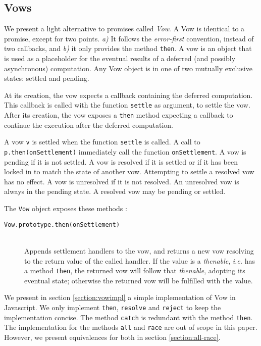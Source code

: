 \subsection{Vows} \label{section:vow}

We present a light alternative to promises called \textit{Vow}.
A Vow is identical to a promise, except for two points.
\textit{a)} It follows the \textit{error-first} convention, instead of two callbacks, and \textit{b)} it only provides the method \texttt{then}.
A vow is an object that is used as a placeholder for the eventual results of a deferred (and possibly asynchronous) computation.
Any Vow object is in one of two mutually exclusive states: settled and pending.

At its creation, the vow expects a callback containing the deferred computation.
This callback is called with the function \texttt{settle} as argument, to settle the vow.
After its creation, the vow exposes a \texttt{then} method expecting a callback to continue the execution after the deferred computation.


A vow \texttt{v} is settled when the function \texttt{settle} is called.
A call to \texttt{p.then(onSettlement)} immediately call the function \texttt{onSettlement}.
A vow is pending if it is not settled.
A vow is resolved if it is settled or if it has been locked in to match the state of another vow.
Attempting to settle a resolved vow has no effect.
A vow is unresolved if it is not resolved.
An unresolved vow is always in the pending state.
A resolved vow may be pending or settled.

The \texttt{Vow} object exposes these methods :
\begin{description}
\item[\texttt{Vow.prototype.then(onSettlement)}]~\\ Appends settlement handlers to the vow, and returns a new vow resolving to the return value of the called handler.
If the value is a \textit{thenable}, \textit{i.e.} has a method \texttt{then}, the returned vow will follow that \textit{thenable}, adopting its eventual state; otherwise the returned vow will be fulfilled with the value.
\end{description}


We present in section \ref{section:vowimpl} a simple implementation of Vow in Javascript.
We only implement \texttt{then}, \texttt{resolve} and \texttt{reject} to keep the implementation concise.
The method \texttt{catch} is redundant with the method \texttt{then}.
The implementation for the methods \texttt{all} and \texttt{race} are out of scope in this paper.
However, we present equivalences for both in section \ref{section:all-race}.



